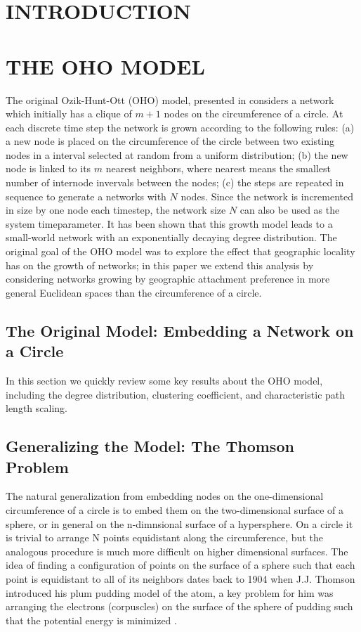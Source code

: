 \documentclass[aps,pre,reprint,superscriptaddress,amsmath,amssymb]{revtex4-1}
\begin{document}
\section{INTRODUCTION}


\section{THE OHO MODEL}
The original Ozik-Hunt-Ott (OHO) model, presented in \cite{ozik2004} considers a network which initially has a clique of $m+1$ nodes on the circumference of a circle. 
At each discrete time step the network is grown according to the following rules: 
(a) a new node is placed on the circumference of the circle between two existing nodes in a interval selected at random from a uniform distribution;
(b) the new node is linked to its $m$ nearest neighbors, where nearest means the smallest number of internode invervals between the nodes;
(c) the steps are repeated in sequence to generate a networks with $N$ nodes.
Since the network is incremented in size by one node each timestep, the network size $N$ can also be used as the system timeparameter.  
It has been shown \cite{ozik2004} that this growth model leads to a small-world network with an exponentially decaying degree distribution. 
The original goal of the OHO model was to explore the effect that geographic locality has on the growth of networks; in this paper we extend this analysis by considering networks growing by geographic attachment preference in more general Euclidean spaces than the circumference of a circle. 

\subsection{The Original Model: Embedding a Network on a Circle}
In this section we quickly review some key results about the OHO model, including the degree distribution, clustering coefficient, and characteristic path length scaling. 

\subsection{Generalizing the Model: The Thomson Problem}
The natural generalization from embedding nodes on the one-dimensional circumference of a circle is to embed them on the two-dimensional surface of a sphere, or in general on the n-dimnsional surface of a hypersphere.
On a circle it is trivial to arrange N points equidistant along the circumference, but the analogous procedure is much more difficult on higher dimensional surfaces. 
The idea of finding a configuration of points on the surface of a sphere such that each point is equidistant to all of its neighbors dates back to 1904 when J.J. Thomson introduced his plum pudding model of the atom, a key problem for him was arranging the electrons (corpuscles) on the surface of the sphere of pudding such that the potential energy is minimized \cite{thomson1904}.
\end{document}
